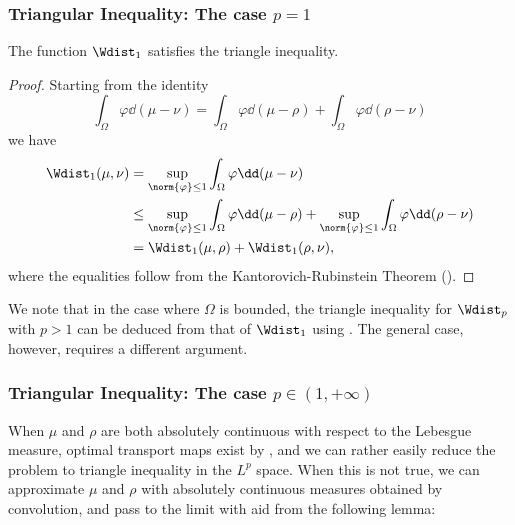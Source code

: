 \documentclass[oneside,reqno,letterpaper]{amsart}
\begin{document}
\subsubsection{Triangular Inequality: The case \texorpdfstring{\(p = 1\)}{p = 1}}
\begin{proposition}\label{prop:Wdist-tri-ineq-p1}
  The function \(\Wdist_1\) satisfies the triangle inequality.
\end{proposition}
\begin{proof}
Starting from the identity
\[
  \int_{\Omega} \varphi \dd (\mu - \nu)
  = \int_{\Omega} \varphi \dd (\mu - \rho) + \int_{\Omega} \varphi \dd (\rho - \nu)
\]
we have
\begin{align*}
  \Wdist_1(\mu, \nu)
  &= \sup_{\norm{\varphi} \leq 1} \int_{\Omega} \varphi \dd (\mu - \nu) \\
  &\leq \sup_{\norm{\varphi} \leq 1} \int_{\Omega} \varphi \dd (\mu - \rho)
    + \sup_{\norm{\varphi} \leq 1} \int_{\Omega} \varphi \dd (\rho - \nu) \\
  &= \Wdist_1(\mu, \rho) + \Wdist_1(\rho, \nu),
\end{align*}
where the equalities follow from the Kantorovich-Rubinstein Theorem ().
\end{proof}

We note that in the case where \(\Omega\) is bounded, the triangle inequality for \(\Wdist_p\) with \(p > 1\) can be deduced from that of \(\Wdist_1\) using .
The general case, however, requires a different argument.


\subsubsection{Triangular Inequality: The case \texorpdfstring{\(p \in (1, +\infty)\)}{p > 1}}
When \(\mu\) and \(\rho\) are both absolutely continuous with respect to the Lebesgue measure, optimal transport maps exist by , and we can rather easily reduce the problem to triangle inequality in the \(L^p\) space.
When this is not true, we can approximate \(\mu\) and \(\rho\) with absolutely continuous measures obtained by convolution, and pass to the limit with aid from the following lemma:
\end{document}
